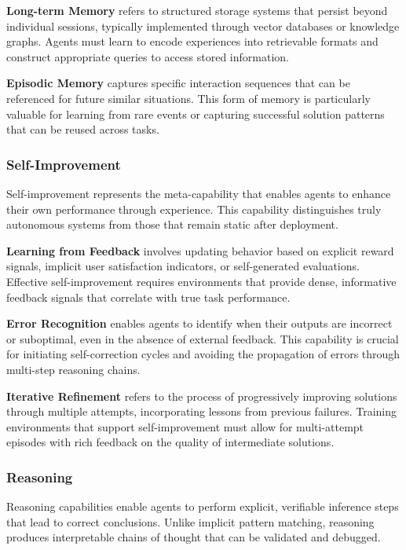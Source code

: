 \textbf{Long-term Memory} refers to structured storage systems that persist beyond individual sessions, typically implemented through vector databases or knowledge graphs. Agents must learn to encode experiences into retrievable formats and construct appropriate queries to access stored information.

\textbf{Episodic Memory} captures specific interaction sequences that can be referenced for future similar situations. This form of memory is particularly valuable for learning from rare events or capturing successful solution patterns that can be reused across tasks.

\subsubsection{Self-Improvement}

Self-improvement represents the meta-capability that enables agents to enhance their own performance through experience. This capability distinguishes truly autonomous systems from those that remain static after deployment.

\textbf{Learning from Feedback} involves updating behavior based on explicit reward signals, implicit user satisfaction indicators, or self-generated evaluations. Effective self-improvement requires environments that provide dense, informative feedback signals that correlate with true task performance.

\textbf{Error Recognition} enables agents to identify when their outputs are incorrect or suboptimal, even in the absence of external feedback. This capability is crucial for initiating self-correction cycles and avoiding the propagation of errors through multi-step reasoning chains.

\textbf{Iterative Refinement} refers to the process of progressively improving solutions through multiple attempts, incorporating lessons from previous failures. Training environments that support self-improvement must allow for multi-attempt episodes with rich feedback on the quality of intermediate solutions.

\subsubsection{Reasoning}

Reasoning capabilities enable agents to perform explicit, verifiable inference steps that lead to correct conclusions. Unlike implicit pattern matching, reasoning produces interpretable chains of thought that can be validated and debugged.

